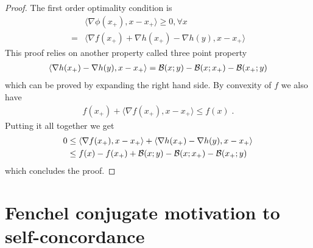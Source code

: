 \documentclass{article}
\begin{document}
\begin{proof}
	The first order optimality condition is
	\begin{align}
		&\langle \nabla \phi (x_+) , x -  x_+ \rangle \geq 0, \forall x \\
		=& \langle \nabla f(x_+) + \nabla h(x_+) - \nabla h (y), x - x_+ \rangle  
	\end{align}
	This proof relies on another property called three point property 
	\begin{align}
		\langle \nabla h(x_+) - \nabla h (y), x - x_+ \rangle  ={\mathcal B}(x;y) -{\mathcal B}(x;x_+) - {\mathcal B}(x_+;y) 
	\end{align}
	which can be proved by expanding the right hand side.
	By convexity of $f$ we also have 
	\begin{align}
		 f(x_+) + \langle \nabla f(x_+), x - x_+ \rangle \leq f(x) \; .
	\end{align} 
	Putting it all together we get
	\begin{align}
		0 
		&\leq  \langle \nabla f(x_+), x - x_+ \rangle + \langle \nabla h(x_+) - \nabla h (y), x - x_+ \rangle  \\
		&\leq f(x) - f(x_+) + {\mathcal B}(x;y) -{\mathcal B}(x;x_+) - {\mathcal B}(x_+;y)
	\end{align}
	which concludes the proof.
\end{proof}

\section{Fenchel conjugate motivation to self-concordance}
\end{document}
